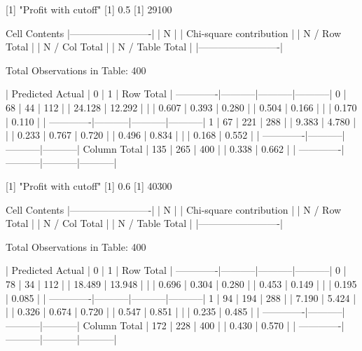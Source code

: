 \documentclass{article}
\begin{document}
\begin{Schunk}
\begin{Soutput}
 
[1] "Profit with cutoff"
[1] 0.5
[1] 29100

 
   Cell Contents
|-------------------------|
|                       N |
| Chi-square contribution |
|           N / Row Total |
|           N / Col Total |
|         N / Table Total |
|-------------------------|

 
Total Observations in Table:  400 

 
             | Predicted 
      Actual |         0 |         1 | Row Total | 
-------------|-----------|-----------|-----------|
           0 |        68 |        44 |       112 | 
             |    24.128 |    12.292 |           | 
             |     0.607 |     0.393 |     0.280 | 
             |     0.504 |     0.166 |           | 
             |     0.170 |     0.110 |           | 
-------------|-----------|-----------|-----------|
           1 |        67 |       221 |       288 | 
             |     9.383 |     4.780 |           | 
             |     0.233 |     0.767 |     0.720 | 
             |     0.496 |     0.834 |           | 
             |     0.168 |     0.552 |           | 
-------------|-----------|-----------|-----------|
Column Total |       135 |       265 |       400 | 
             |     0.338 |     0.662 |           | 
-------------|-----------|-----------|-----------|

 
[1] "Profit with cutoff"
[1] 0.6
[1] 40300

 
   Cell Contents
|-------------------------|
|                       N |
| Chi-square contribution |
|           N / Row Total |
|           N / Col Total |
|         N / Table Total |
|-------------------------|

 
Total Observations in Table:  400 

 
             | Predicted 
      Actual |         0 |         1 | Row Total | 
-------------|-----------|-----------|-----------|
           0 |        78 |        34 |       112 | 
             |    18.489 |    13.948 |           | 
             |     0.696 |     0.304 |     0.280 | 
             |     0.453 |     0.149 |           | 
             |     0.195 |     0.085 |           | 
-------------|-----------|-----------|-----------|
           1 |        94 |       194 |       288 | 
             |     7.190 |     5.424 |           | 
             |     0.326 |     0.674 |     0.720 | 
             |     0.547 |     0.851 |           | 
             |     0.235 |     0.485 |           | 
-------------|-----------|-----------|-----------|
Column Total |       172 |       228 |       400 | 
             |     0.430 |     0.570 |           | 
-------------|-----------|-----------|-----------|


\end{Soutput}
\end{Schunk}
\end{document}
